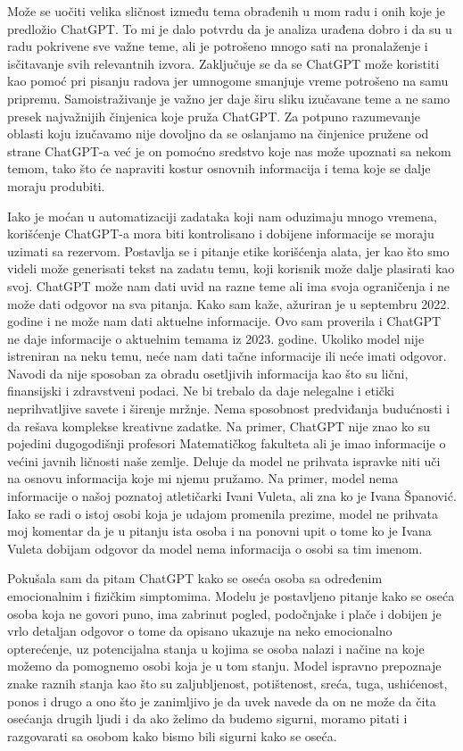 \documentclass[a4paper]{article}
\begin{document}
{Može se uočiti velika sličnost između tema obrađenih u mom radu i onih koje je predložio ChatGPT. To mi je dalo potvrdu da je analiza urađena dobro i da su u radu pokrivene sve važne teme, ali je potrošeno mnogo sati na pronalaženje i isčitavanje svih relevantnih izvora. Zaključuje se da se ChatGPT može koristiti kao pomoć pri pisanju radova jer umnogome smanjuje vreme potrošeno na samu pripremu. Samoistraživanje je važno jer daje širu sliku izučavane teme a ne samo presek najvažnijih činjenica koje pruža ChatGPT. Za potpuno razumevanje oblasti koju izučavamo nije dovoljno da se oslanjamo na činjenice pružene od strane ChatGPT-a već je on pomoćno sredstvo koje nas može upoznati sa nekom temom, tako što će napraviti kostur osnovnih informacija i tema koje se dalje moraju produbiti. 

Iako je moćan u automatizaciji zadataka koji nam oduzimaju mnogo vremena, korišćenje ChatGPT-a mora biti kontrolisano i dobijene informacije se moraju uzimati sa rezervom. Postavlja se i pitanje etike korišćenja alata, jer kao što smo videli može generisati tekst na zadatu temu, koji korisnik može dalje plasirati kao svoj. ChatGPT može nam dati uvid na razne teme ali ima svoja ograničenja i ne može dati odgovor na sva pitanja. Kako sam kaže, ažuriran je u septembru 2022. godine i ne može nam dati aktuelne informacije. Ovo sam proverila i ChatGPT ne daje informacije o aktuelnim temama iz 2023. godine. Ukoliko model nije istreniran na neku temu, neće nam dati tačne informacije ili neće imati odgovor. Navodi da nije sposoban za obradu osetljivih informacija kao što su lični, finansijski i zdravstveni podaci. Ne bi trebalo da daje nelegalne i etički neprihvatljive savete i širenje mržnje. Nema sposobnost predviđanja budućnosti i da rešava komplekse kreativne zadatke. Na primer, ChatGPT nije znao ko su pojedini dugogodišnji profesori Matematičkog fakulteta ali je imao informacije o većini javnih ličnosti naše zemlje.
Deluje da model ne prihvata ispravke niti uči na osnovu informacija koje mi njemu pružamo. Na primer, model nema informacije o našoj poznatoj atletičarki Ivani Vuleta, ali zna ko je Ivana Španović. Iako se radi o istoj osobi koja je udajom promenila prezime, model ne prihvata moj komentar da je u pitanju ista osoba i na ponovni upit o tome ko je Ivana Vuleta dobijam odgovor da model nema informacija o osobi sa tim imenom. 

Pokušala sam da pitam ChatGPT kako se oseća osoba sa određenim emocionalnim i fizičkim simptomima. Modelu je postavljeno pitanje kako se oseća osoba koja ne govori puno, ima zabrinut pogled, podočnjake i plače i dobijen je vrlo detaljan odgovor o tome da opisano ukazuje na neko emocionalno opterećenje, uz potencijalna stanja u kojima se osoba nalazi i načine na koje možemo da pomognemo osobi koja je u tom stanju. Model ispravno prepoznaje znake raznih stanja kao što su zaljubljenost, potištenost, sreća, tuga, ushićenost, ponos i drugo a ono što je zanimljivo je da uvek navede da on ne može da čita osećanja drugih ljudi i da ako želimo da budemo sigurni, moramo pitati i razgovarati sa osobom kako bismo bili sigurni kako se oseća. 

}
\end{document}
